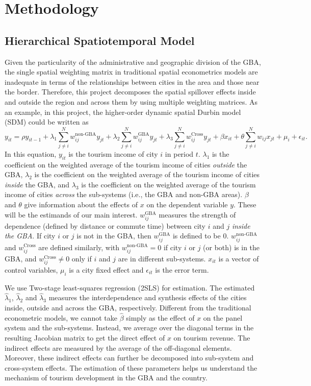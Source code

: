 \documentclass[11pt,a4paper]{amsart}
\theoremstyle{plain}
\theoremstyle{definition}
\begin{document}
\section{Methodology}
\subsection{Hierarchical Spatiotemporal Model}\hfill\par 
\noindent Given the particularity of the administrative and geographic division of the GBA, the single spatial weighting matrix in traditional spatial econometrics models are inadequate in terms of the relationships between cities in the area and those near the border. Therefore, this project decomposes the spatial spillover effects inside and outside the region and across them by using multiple weighting matrices. As an example, in this project, the higher-order dynamic spatial Durbin model (SDM) could be written as 
\[	y_{it} = \rho y_{it-1} + \lambda_{1} \sum_{j \ne i}^{N}w_{ij}^{\text{non-GBA}}y_{jt} + \lambda_{2}\sum_{j \ne i}^{N}w_{ij}^{\text{GBA}} y_{jt} + \lambda_{3}\sum_{j \ne i}^{N}w_{ij}^{\text{Cross}} y_{jt}  + \beta x_{it} + \theta \sum_{j \ne i}^{N}w_{ij}x_{jt} + \mu_{i} + \epsilon_{it}.	\]
In this equation, $y_{it}$ is the tourism income of city $i$ in period $t$. $\lambda_{1}$ is the coefficient on the weighted average of the tourism income of cities \textit{outside} the GBA, $\lambda_{2}$ is the coefficient on the weighted average of the tourism income of cities \textit{inside} the GBA, and $\lambda_{3}$ is the coefficient on the weighted average of the tourism income of cities \textit{across} the sub-systems (i.e., the GBA and non-GBA areas). $\beta$ and $\theta$ give information about the effects of $x$ on the dependent variable $y$. These will be the estimands of our main interest. $w_{ij}^{\text{GBA}}$ measures the strength of dependence (defined by distance or commute time) between city $i$ and $j$ \textit{inside the GBA}. If city $i$ or $j$ is not in the GBA, then $w_{ij}^{\text{GBA}}$ is defined to be $0$. $w_{ij}^{\text{non-GBA}}$ and $w_{ij}^{\text{Cross}}$ are defined similarly, with $w_{ij}^{\text{non-GBA}} = 0$ if city $i$ or $j$ (or both) is in the GBA, and  $w_{ij}^{\text{Cross}} \ne 0$ only if $i$ and $j$ are in different sub-systems. $x_{it}$ is a vector of control variables, $\mu_{i}$ is a city fixed effect and $\epsilon_{it}$ is the error term. 

We use Two-stage least-squares regression (2SLS) for estimation. The estimated $\widehat{\lambda}_{1}$,  $\widehat{\lambda}_{2}$ and  $\widehat{\lambda}_{3}$ measures the interdependence and synthesis effects of the cities inside, outside and across the GBA, respectively. Different from the traditional econometric models, we cannot take $\widehat{\beta}$ simply as the effect of $x$ on the panel system and the sub-systems. Instead, we average over the diagonal terms in the resulting Jacobian matrix to get the direct effect of $x$ on tourism revenue. The indirect effects are measured by the average of the off-diagonal elements. Moreover, these indirect effects can further be decomposed into sub-system and cross-system effects. The estimation of these parameters helps us understand the mechanism of tourism development in the GBA and the country.
		
\end{document}
